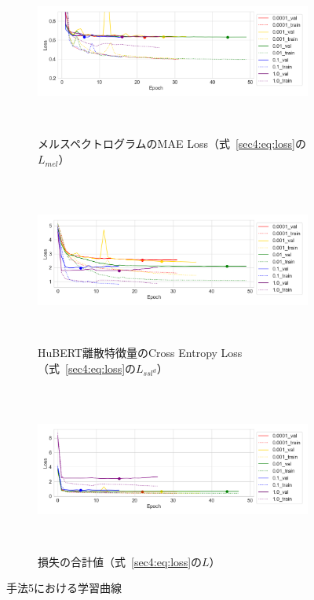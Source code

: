 \documentclass[12pt]{jarticle}
\numberwithin{equation}{section}    %
\numberwithin{figure}{section}      %
\numberwithin{table}{section}      %
\begin{document}
\begin{figure}[bt]
    \centering
    \begin{subfigure}{\linewidth}
        \centering
        \includegraphics[height=55mm]{./figure/sec4/learning_curve/impact_of_loss_weights_across_methods/5/mel_loss.png}
        \caption{メルスペクトログラムのMAE Loss（式~\eqref{sec4:eq:loss}の$L_{mel}$）}
        \label{sec4:fig:learning_curve_method_5_val_mel_loss}
    \end{subfigure}
    \begin{subfigure}{\linewidth}
        \centering
        \includegraphics[height=55mm]{./figure/sec4/learning_curve/impact_of_loss_weights_across_methods/5/ssl_feature_cluster_loss.png}
        \caption{HuBERT離散特徴量のCross Entropy Loss（式~\eqref{sec4:eq:loss}の$L_{ssl^{d}}$）}
        \label{sec4:fig:learning_curve_method_5_val_ssl_feature_cluster_loss}
    \end{subfigure}
    \begin{subfigure}{\linewidth}
        \centering
        \includegraphics[height=55mm]{./figure/sec4/learning_curve/impact_of_loss_weights_across_methods/5/total_loss.png}
        \caption{損失の合計値（式~\eqref{sec4:eq:loss}の$L$）}
        \label{sec4:fig:learning_curve_method_5_val_total_loss}
    \end{subfigure}
    \caption{手法5における学習曲線}
    \label{sec4:fig:learning_curve_method_5_val_losses}
\end{figure}
\end{document}
